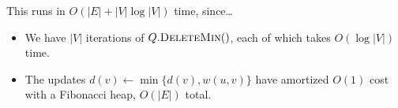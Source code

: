 This runs in $O(|E| + |V|\log |V|)$ time, since\dots
\begin{itemize}
    \item We have $|V|$ iterations of $Q.\textsc{DeleteMin}()$, each of which takes $O(\log |V|)$ time.
    \item The updates $d(v) \leftarrow \min \{d(v), w(u, v)\}$ have amortized $O(1)$ cost with a Fibonacci heap, $O(|E|)$ total.
\end{itemize}

